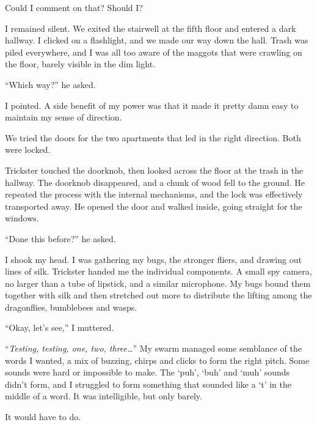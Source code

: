 Could I comment on that?  Should I?



I remained silent.  We exited the stairwell at the fifth floor and entered a dark hallway.  I clicked on a flashlight, and we made our way down the hall.  Trash was piled everywhere, and I was all too aware of the maggots that were crawling on the floor, barely visible in the dim light.



``Which way?'' he asked.



I pointed.  A side benefit of my power was that it made it pretty damn easy to maintain my sense of direction.



We tried the doors for the two apartments that led in the right direction.  Both were locked.



Trickster touched the doorknob, then looked across the floor at the trash in the hallway.  The doorknob disappeared, and a chunk of wood fell to the ground.  He repeated the process with the internal mechanisms, and the lock was effectively transported away.  He opened the door and walked inside, going straight for the windows.



``Done this before?'' he asked.



I shook my head.  I was gathering my bugs, the stronger fliers, and drawing out lines of silk.  Trickster handed me the individual components.  A small spy camera, no larger than a tube of lipstick, and a similar microphone.  My bugs bound them together with silk and then stretched out more to distribute the lifting among the dragonflies, bumblebees and wasps.



``Okay, let's see,'' I muttered.



``\emph{Testing, testing, one, two, three\ldots}'' My swarm managed some semblance of the words I wanted, a mix of buzzing, chirps and clicks to form the right pitch.  Some sounds were hard or impossible to make.  The `puh', `buh' and `muh' sounds didn't form, and I struggled to form something that sounded like a `t' in the middle of a word.  It was intelligible, but only barely.



It would have to do.



